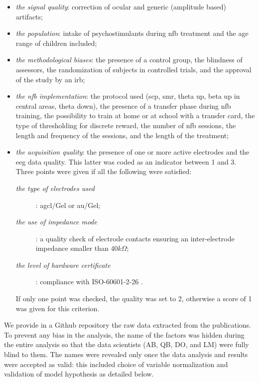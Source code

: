 \begin{itemize}
  \item \emph{the signal quality}: correction of ocular and generic (amplitude based) artifacts;
  \item \emph{the population}: intake of psychostimulants during \gls{nfb} treatment and the age range of children
  included;
  \item \emph{the methodological biases}: the presence of a control group, the blindness of assessors, 
  the randomization of subjects in controlled trials, and the approval of the study by an \gls{irb};
  \item \emph{the \gls{nfb} implementation}: the protocol used (\gls{scp}, \gls{smr}, 
  theta up, beta up in central areas, theta down), the presence of a transfer phase during \gls{nfb} training, the 
	possibility to train at home or at school with a transfer card, 
  the type of thresholding for discrete reward, the number of \gls{nfb} sessions, the length and frequency of the sessions, and the length of
  the treatment;
  \item \emph{the acquisition quality}: the presence of one or more active electrodes and the \gls{eeg} data quality. 
  This latter was coded as an indicator between 1 and 3. Three points were given if all the following were satisfied:  
	\begin{description}
	  \item[\emph{the type of electrodes used}]: \gls{agcl}/Gel or \gls{au}/Gel;
    \item[\emph{the use of impedance mode}]: a quality check of electrode contacts
		ensuring an inter-electrode impedance smaller than $40k\Omega$;  
    \item[\emph{the level of hardware certificate}]: compliance with ISO-60601-2-26 \citep{ISO-60601-2-26:2012}.
	\end{description}
	If only one point was checked, the quality was set to 2, otherwise a score of 1 was given for this criterion.
\end{itemize}	

We provide in a Github repository \citep{Bussalb2018} the raw data extracted from the publications. To prevent any
bias in the analysis, the name of the factors was hidden during the entire analysis so that the data scientists (AB, QB,
DO, and LM) were fully blind to them. The names were revealed only once the data  analysis and results were accepted as valid: 
this included choice of variable normalization and validation of model hypothesis as detailed below.

